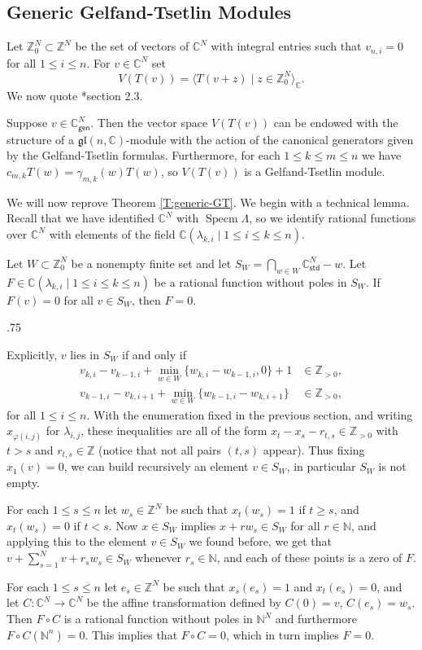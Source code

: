 \documentclass[11pt,fleqn]{article}
\makeatletter
\newcounter{para}[section]
\renewenvironment{proof}[1][\textit{Proof}]{\par
  \pushQED{\qed}%
  \normalfont \topsep.75\paraskip\relax
  \trivlist
  \item[\hskip\labelsep
        \itshape
    #1\@addpunct{.}]\ignorespaces
}{%
  \popQED\endtrivlist\@endpefalse
}
\newcommand\NN{\mathbb N}
\newcommand\CC{\mathbb C}
\newcommand\ZZ{\mathbb Z}
\renewcommand\to{\longrightarrow}
\renewcommand\phi{\varphi}
\newcommand\gl{\mathfrak{gl}}
\newcommand\gen{\mathsf{gen}}
\newcommand\std{\mathsf{std}}
\DeclareMathOperator\Specm{Specm}
\makeatother
\begin{document}
\subsection{Generic Gelfand-Tsetlin Modules}
Let $\ZZ_0^N \subset \ZZ^N$ be the set of vectors of $\CC^N$ with integral 
entries such that $v_{n,i} = 0$ for all $1 \leq i \leq n$. For $v \in \CC^N$
set 
\[
	V(T(v)) = \langle T(v+z) \mid z \in \ZZ^N_0 \rangle_\CC.
\]
We now quote \cite{DFO-GT-modules}*{section 2.3}.
\begin{Theorem}
\label{T:generic-GT}
Suppose $v \in \CC_\gen^N$. Then the vector space $V(T(v))$ can be endowed 
with the structure of a $\gl(n,\CC)$-module with the action of the canonical 
generators given by the Gelfand-Tsetlin formulas. Furthermore, for each $1 
\leq k \leq m \leq n$ we have $c_{m,k} T(w) = \gamma_{m,k}(w) T(w)$, so 
$V(T(v))$ is a Gelfand-Tsetlin module.
\end{Theorem}

We will now reprove Theorem \ref{T:generic-GT}. We begin with a technical 
lemma. Recall that we have identified $\CC^N$ with $\Specm \Lambda$, so
we identify rational functions over $\CC^N$ with elements of the field
$\CC(\lambda_{k,i} \mid 1 \leq i \leq k \leq n)$.
\begin{Lemma}
\label{L:rational-zeroes}
Let $W \subset \ZZ^N_0$ be a nonempty finite set and let $S_W = \bigcap_{w \in 
W} \CC^N_\std - w$. Let $F \in \CC(\lambda_{k,i} \mid 1 \leq i \leq k \leq n)$ 
be a rational function without poles in $S_W$. If $F(v) = 0$ for all $v \in 
S_W$, then $F = 0$.
\end{Lemma}
\begin{proof}
Explicitly, $v$ lies in $S_W$ if and only if
\begin{align*}
v_{k,i} - v_{k-1,i} + \min_{w \in W}\{w_{k,i} - w_{k-1,i}, 0\} + 1 
	&\in \ZZ_{> 0}, \\
v_{k-1,i} - v_{k,i+1} + \min_{w \in W}\{w_{k-1,i} - w_{k,i+1}\}
	&\in \ZZ_{>0},
\end{align*}
for all $1 \leq i \leq n$. With the enumeration fixed in the previous section,
and writing $x_{\phi(i,j)}$ for $\lambda_{i,j}$, these inequalities are all of 
the form $x_t - x_s - r_{t,s} \in \ZZ_{>0}$ with $t > s$ and $r_{t,s} \in \ZZ$ 
(notice that not all pairs $(t,s)$ appear). Thus fixing $x_1(v) = 0$, we can 
build recursively an element $v \in S_W$, in particular $S_W$ is not empty.

For each $1 \leq s \leq n$ let $w_s \in \ZZ^N$ be such that $x_t(w_s) = 1$ if 
$t \geq s$, and $x_t(w_s) = 0$ if $t < s$. Now $x \in S_W$ implies $x + r w_s 
\in S_W$ for all $r \in \NN$, and applying this to the element $v \in S_W$ we 
found before, we get that $v + \sum_{s=1}^N v + r_s w_s \in S_W$ whenever $r_s 
\in \NN$, and each of these points is a zero of $F$.

For each $1 \leq s \leq n$ let $e_s \in \ZZ^N$ be such that $x_s(e_s) = 1$
and $x_t(e_s) = 0$, and let $C: \CC^N \to \CC^N$ be the affine transformation
defined by $C(0) = v$, $C(e_s) = w_s$. Then $F \circ C$ is a rational function
without poles in $\NN^N$ and furthermore $F \circ C(\NN^n) = 0$. This implies
that $F \circ C = 0$, which in turn implies $F = 0$.
\end{proof}
\end{document}
